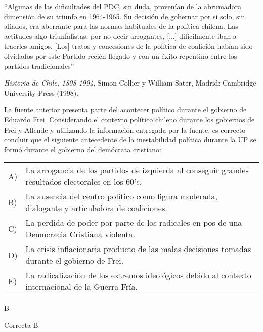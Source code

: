 \documentclass[letterpaper,11pt]{article}
\newcommand{\anchopregunta}{0.9\textwidth}
\begin{document}
\begin{enumerate}
\begin{minipage}{\anchopregunta}
\item ``Algunas de las dificultades del PDC, sin duda, provenían de la abrumadora dimensión de su triunfo en 1964-1965. Su decisión de gobernar por sí solo, sin aliados, era aberrante para las normas habituales de la política chilena. Las actitudes algo triunfalistas, por no decir arrogantes, [...] difícilmente iban a traerles amigos. [Los] tratos y concesiones de la política de coalición habían sido olvidados por este Partido recién llegado y con un éxito repentino entre los partidos tradicionales''\\
\begin{flushright}
\textit{Historia de Chile, 1808-1994}, Simon Collier y  William Sater, Madrid: Cambridge University Press (1998).
\end{flushright}
La fuente anterior presenta parte del acontecer político durante el gobierno de Eduardo Frei. Considerando el contexto político chileno durante los gobiernos de Frei y Allende y utilizando la información entregada por la fuente, es correcto concluir que el siguiente antecedente de la inestabilidad política durante la UP se formó durante el gobierno del demócrata cristiano:
\begin{flushleft}\begin{tabular}{@{\hspace{-.001\textwidth}}l@{\hspace{2pt}}p{}}
A)& La arrogancia de los partidos de izquierda al conseguir grandes resultados electorales en los 60's.\\
B)& La ausencia del centro político como figura moderada, dialogante y articuladora de coaliciones.\\
C)& La perdida de poder por parte de los radicales en pos de una Democracia Cristiana violenta.\\
D)& La crisis inflacionaria producto de las malas decisiones tomadas durante el gobierno de Frei.\\
E)& La radicalización de los extremos ideológicos debido al contexto internacional de la Guerra Fría.\\ 
\end{tabular}\end{flushleft}%
\begin{key} B
\end{key} 
\begin{hint}
\end{hint}
\begin{answer} Correcta B \\

\end{answer}
\end{minipage}
\end{enumerate}
\end{document}
